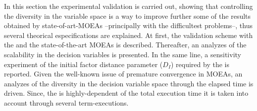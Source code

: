 \begin{figure}[t]
\centering

\label{fig:Diversity}
\end{figure}


\begin{figure}[t]
\centering

\label{fig:Performance_time}
\end{figure}



In this section the experimental validation is carried out, showing that controlling the diversity in the variable space is a way to improve further some of the results obtained by state-of-art-MOEAs --principally with the difficultest problems--, thus several theorical especifications are explained.
%
At first, the validation scheme with the \VSDMOEA{} and the state-of-the-art MOEAs is described.
%
Thereafter, an analyzes of the scalability in the decision variables is presented.
%
In the same line, a sensitivity experiment of the initial factor distance parameter ($D_I$) required by the \VSDMOEA{} is reported.
%
Given the well-known issue of premature convergence in MOEAs, an analyzes of the diversity in the decision variable space through the elapsed time is driven.
%
Since, the \VSDMOEA{} is highly-dependent of the total execution time it is taken into account through several term-executions.


%



